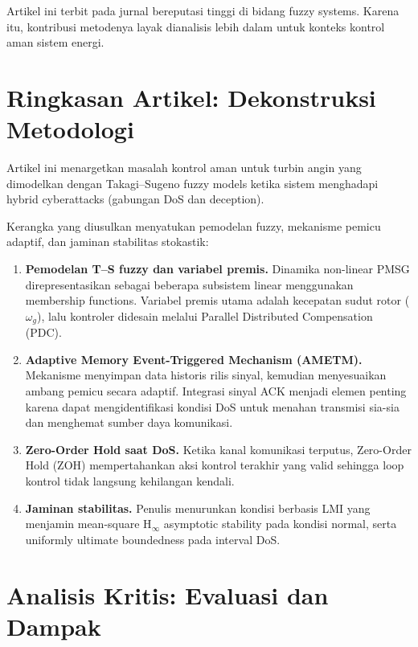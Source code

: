 \documentclass{article}
\begin{document}
\vspace{0.4cm}

Artikel ini terbit pada jurnal bereputasi tinggi di bidang fuzzy
systems. Karena itu, kontribusi metodenya layak dianalisis lebih dalam
untuk konteks kontrol aman sistem energi.

\section*{Ringkasan Artikel: Dekonstruksi Metodologi}

Artikel ini menargetkan masalah kontrol aman untuk turbin angin yang
dimodelkan dengan Takagi--Sugeno fuzzy models ketika sistem menghadapi
hybrid cyberattacks (gabungan DoS dan deception).

Kerangka yang diusulkan menyatukan pemodelan fuzzy, mekanisme pemicu
adaptif, dan jaminan stabilitas stokastik:

\begin{enumerate}
    \item \textbf{Pemodelan T--S fuzzy dan variabel premis.}
    Dinamika non-linear PMSG direpresentasikan sebagai beberapa
    subsistem linear menggunakan membership functions. Variabel premis
    utama adalah kecepatan sudut rotor
    (\ensuremath{\omega_g}), lalu kontroler didesain melalui Parallel
    Distributed Compensation (PDC).

    \item \textbf{Adaptive Memory Event-Triggered Mechanism (AMETM).}
    Mekanisme menyimpan data historis rilis sinyal, kemudian menyesuaikan
    ambang pemicu secara adaptif. Integrasi sinyal ACK menjadi elemen
    penting karena dapat mengidentifikasi kondisi DoS untuk menahan
    transmisi sia-sia dan menghemat sumber daya komunikasi.

    \item \textbf{Zero-Order Hold saat DoS.}
    Ketika kanal komunikasi terputus, Zero-Order Hold (ZOH)
    mempertahankan aksi kontrol terakhir yang valid sehingga loop kontrol
    tidak langsung kehilangan kendali.

    \item \textbf{Jaminan stabilitas.}
    Penulis menurunkan kondisi berbasis LMI yang menjamin
    mean-square H\ensuremath{_\infty} asymptotic stability pada kondisi
    normal, serta uniformly ultimate boundedness pada interval DoS.
\end{enumerate}

\section*{Analisis Kritis: Evaluasi dan Dampak}
\end{document}

